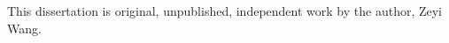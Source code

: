 \begin{preface}
    This dissertation is original, unpublished, independent work by the author, Zeyi Wang.
\end{preface}